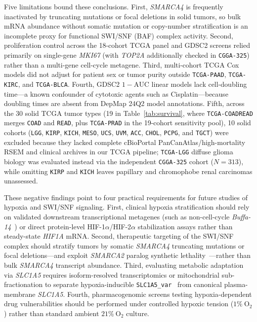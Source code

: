 \documentclass[11pt]{article}
\begin{document}
Five limitations bound these conclusions. First, \textit{SMARCA4} is frequently inactivated by truncating mutations or focal deletions in solid tumors, so bulk mRNA abundance without somatic mutation or copy-number stratification is an incomplete proxy for functional SWI/SNF (BAF) complex activity. Second, proliferation control across the 18-cohort TCGA panel and GDSC2 screens relied primarily on single-gene \textit{MKI67} (with \textit{TOP2A} additionally checked in \texttt{CGGA-325}) rather than a multi-gene cell-cycle metagene. Third, multi-cohort TCGA Cox models did not adjust for patient sex or tumor purity outside \texttt{TCGA-PAAD}, \texttt{TCGA-KIRC}, and \texttt{TCGA-BLCA}. Fourth, GDSC2 $1 - \text{AUC}$ linear models lack cell-doubling time---a known confounder of cytotoxic agents such as Cisplatin---because doubling times are absent from DepMap 24Q2 model annotations. Fifth, across the 30 solid TCGA tumor types (19 in Table~\ref{tab:survival}, where \texttt{TCGA-COADREAD} merges \texttt{COAD} and \texttt{READ}, plus \texttt{TCGA-PRAD} in the 19-cohort sensitivity pool), 10 solid cohorts (\texttt{LGG}, \texttt{KIRP}, \texttt{KICH}, \texttt{MESO}, \texttt{UCS}, \texttt{UVM}, \texttt{ACC}, \texttt{CHOL}, \texttt{PCPG}, and \texttt{TGCT}) were excluded because they lacked complete cBioPortal PanCanAtlas/high-mortality RSEM and clinical archives in our TCGA pipeline; \texttt{TCGA-LGG} diffuse glioma biology was evaluated instead via the independent \texttt{CGGA-325} cohort ($N = 313$), while omitting \texttt{KIRP} and \texttt{KICH} leaves papillary and chromophobe renal carcinomas unassessed.

These negative findings point to four practical requirements for future studies of hypoxia and SWI/SNF signaling. First, clinical hypoxia stratification should rely on validated downstream transcriptional metagenes (such as non-cell-cycle \textit{Buffa-14}~\cite{buffa2010}) or direct protein-level HIF-1$\alpha$/HIF-2$\alpha$ stabilization assays rather than steady-state \textit{HIF1A} mRNA. Second, therapeutic targeting of the SWI/SNF complex should stratify tumors by somatic \textit{SMARCA4} truncating mutations or focal deletions---and exploit \textit{SMARCA2} paralog synthetic lethality~\cite{hoffman2014}---rather than bulk \textit{SMARCA4} transcript abundance. Third, evaluating metabolic adaptation via \textit{SLC1A5} requires isoform-resolved transcriptomics or mitochondrial sub-fractionation to separate hypoxia-inducible \texttt{SLC1A5\_var}~\cite{yoo2020} from canonical plasma-membrane \textit{SLC1A5}. Fourth, pharmacogenomic screens testing hypoxia-dependent drug vulnerabilities should be performed under controlled hypoxic tension ($1\%\ \text{O}_2$) rather than standard ambient $21\%\ \text{O}_2$ culture.
\end{document}
